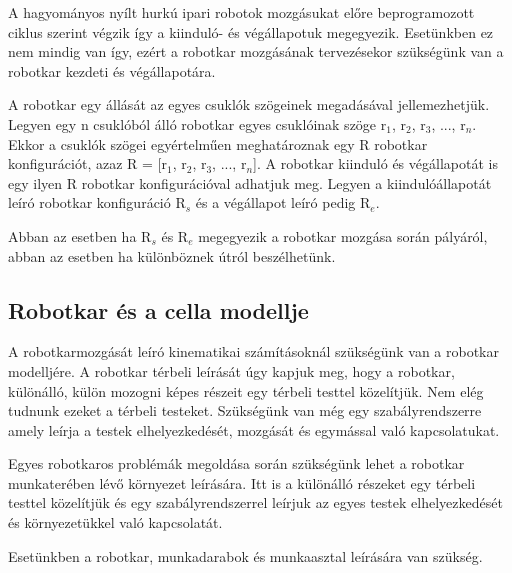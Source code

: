 A hagyományos nyílt hurkú ipari robotok mozgásukat előre beprogramozott ciklus szerint végzik így a kiinduló- és végállapotuk megegyezik. Esetünkben ez nem mindig van így, ezért a robotkar mozgásának tervezésekor szükségünk van a robotkar kezdeti és végállapotára. 

A robotkar egy állását az egyes csuklók szögeinek megadásával jellemezhetjük. Legyen egy n csuklóból álló robotkar egyes csuklóinak szöge r$_1$, r$_2$, r$_3$, ..., r$_n$. Ekkor a csuklók szögei egyértelműen meghatároznak egy R robotkar konfigurációt, azaz R = [r$_1$, r$_2$, r$_3$, ..., r$_n$]. A robotkar kiinduló és végállapotát is egy ilyen R robotkar konfigurációval adhatjuk meg. Legyen a kiindulóállapotát leíró robotkar konfiguráció R$_s$ és a végállapot leíró pedig R$_e$.

Abban az esetben ha R$_s$ és R$_e$ megegyezik a robotkar mozgása során pályáról, abban az esetben ha különböznek útról beszélhetünk.


\subsection{Robotkar és a cella modellje}

A robotkarmozgását leíró kinematikai számításoknál szükségünk van a robotkar modelljére. A robotkar térbeli leírását úgy kapjuk meg, hogy a robotkar, különálló, külön mozogni képes részeit egy térbeli testtel közelítjük. Nem elég tudnunk ezeket a térbeli testeket. Szükségünk van még egy szabályrendszerre amely leírja a testek elhelyezkedését, mozgását és egymással való kapcsolatukat.

Egyes robotkaros problémák megoldása során szükségünk lehet a robotkar munkaterében lévő környezet leírására. Itt is a különálló részeket egy térbeli testtel közelítjük és egy szabályrendszerrel leírjuk az egyes testek elhelyezkedését és környezetükkel való kapcsolatát.

Esetünkben a robotkar, munkadarabok és munkaasztal leírására van szükség.

